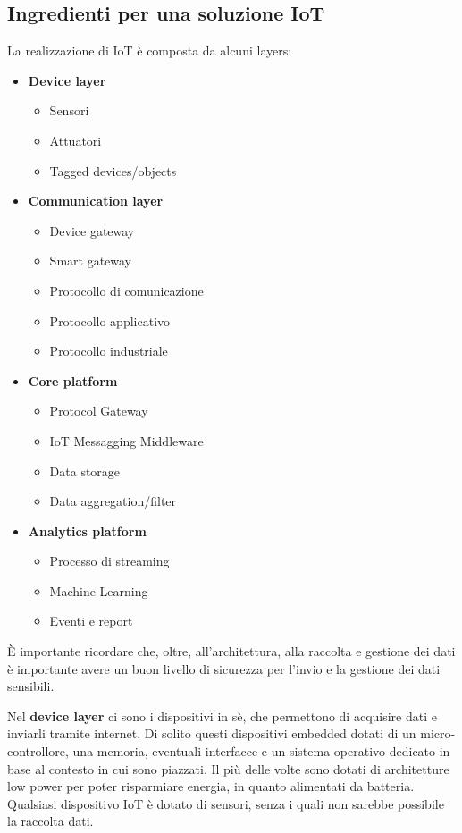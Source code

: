 \documentclass[10pt,a4paper,oneside]{scrbook}
\begin{document}
\subsection{Ingredienti per una soluzione IoT}
La realizzazione di IoT è composta da alcuni layers:
\begin{itemize}
    \item \textbf{Device layer}
    \begin{itemize}
        \item Sensori
        \item Attuatori
        \item Tagged devices/objects
    \end{itemize}
    \item \textbf{Communication layer}
    \begin{itemize}
        \item Device gateway
        \item Smart gateway
        \item Protocollo di comunicazione
        \item Protocollo applicativo
        \item Protocollo industriale
    \end{itemize}
    \item \textbf{Core platform}
    \begin{itemize}
        \item Protocol Gateway
        \item IoT Messagging Middleware
        \item Data storage
        \item Data aggregation/filter
    \end{itemize}
    \item \textbf{Analytics platform}
    \begin{itemize}
        \item Processo di streaming
        \item Machine Learning
        \item Eventi e report
    \end{itemize}
\end{itemize}
È importante ricordare che, oltre, all'architettura, alla raccolta e gestione dei dati è importante avere un buon livello di
sicurezza per l'invio e la gestione dei dati sensibili. 

Nel \textbf{device layer} ci sono i dispositivi in sè, che permettono di acquisire dati e inviarli tramite internet.
Di solito questi dispositivi embedded dotati di un micro-controllore, una memoria, eventuali interfacce e un sistema operativo dedicato
in base al contesto in cui sono piazzati. Il più delle volte sono dotati di architetture low power per poter risparmiare energia,
in quanto alimentati da batteria. Qualsiasi dispositivo IoT è dotato di sensori, senza i quali non sarebbe possibile la raccolta dati.
\end{document}
